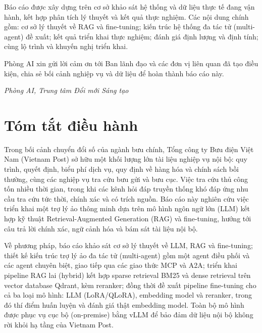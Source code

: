 Báo cáo được xây dựng trên cơ sở khảo sát hệ thống và dữ liệu thực tế đang vận hành, kết
hợp phân tích lý thuyết và kết quả thực nghiệm. Các nội dung chính gồm: cơ sở lý thuyết về
RAG và fine-tuning; kiến trúc hệ thống đa tác tử (multi-agent) đề xuất; kết quả triển khai
thực nghiệm; đánh giá định lượng và định tính; cùng lộ trình và khuyến nghị triển khai.

Phòng AI xin gửi lời cảm ơn tới Ban lãnh đạo và các đơn vị liên quan đã tạo điều kiện,
chia sẻ bối cảnh nghiệp vụ và dữ liệu để hoàn thành báo cáo này.

\vspace{1cm}
\begin{flushright}
\emph{Phòng AI, Trung tâm Đổi mới Sáng tạo}
\end{flushright}

\chapter*{Tóm tắt điều hành}
Trong bối cảnh chuyển đổi số của ngành bưu chính, Tổng công ty Bưu điện Việt Nam
(Vietnam Post) sở hữu một khối lượng lớn tài liệu nghiệp vụ nội bộ: quy trình, quyết định,
biểu phí dịch vụ, quy định về hàng hóa và chính sách bồi thường, cùng các nghiệp vụ
tra cứu bưu gửi và bưu cục. Việc tra cứu thủ công tốn nhiều thời gian, trong khi các
kênh hỏi đáp truyền thống khó đáp ứng nhu cầu tra cứu tức thời, chính xác và có trích
nguồn. Báo cáo này nghiên cứu việc triển khai một trợ lý ảo thông minh dựa trên mô
hình ngôn ngữ lớn (LLM) kết hợp kỹ thuật Retrieval-Augmented Generation (RAG) và
fine-tuning, hướng tới câu trả lời chính xác, ngữ cảnh hóa và bám sát tài liệu nội bộ.

Về phương pháp, báo cáo khảo sát cơ sở lý thuyết về LLM, RAG và fine-tuning; thiết kế
kiến trúc trợ lý ảo đa tác tử (multi-agent) gồm một agent điều phối và các agent
chuyên biệt, giao tiếp qua các giao thức MCP và A2A; triển khai pipeline RAG lai
(hybrid) kết hợp sparse retrieval BM25 và dense retrieval trên vector database Qdrant,
kèm reranker; đồng thời đề xuất pipeline fine-tuning cho cả ba loại mô hình: LLM (LoRA/QLoRA),
embedding model và reranker, trong đó thí điểm huấn luyện và đánh giá thật embedding model.
Toàn bộ mô hình được phục vụ cục bộ (on-premise) bằng vLLM để bảo đảm dữ liệu nội bộ không
rời khỏi hạ tầng của Vietnam Post.

